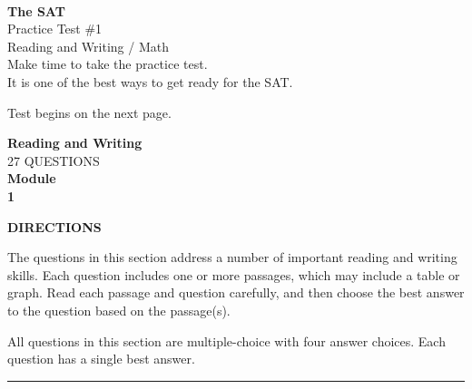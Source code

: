 \documentclass[11pt, twocolumn]{article}
\newcommand{\currentmodulename}{}
\newcommand{\setmodulename}[1]{\renewcommand{\currentmodulename}{#1}}
\newcounter{questionnum}
\begin{document}
\onecolumn
\newpage
\thispagestyle{plainpage}
\begin{center}
\vspace*{1.5in}
{\Huge\textbf{The SAT\textsuperscript{\textregistered}}}\\[24pt]
{\Large Practice Test \#1}\\[24pt]
{\large Reading and Writing / Math}\\[12pt]
{\normalsize Make time to take the practice test.}\\
{\normalsize It is one of the best ways to get ready for the SAT.}
\end{center}

\onecolumn
\newpage
\thispagestyle{plainpage}
\begin{center}
\vspace*{3in}
{\large Test begins on the next page.}
\end{center}

\setmodulename{Medium}
\onecolumn
\newpage
\thispagestyle{plainpage}
\setcounter{questionnum}{0}
\begin{center}
{\Large\textbf{Reading and Writing}}\\[6pt]
{\large 27 QUESTIONS}\\[4pt]
{\large\textbf{Module}}\\
{\Large\textbf{1}}
\end{center}
\vspace{8pt}
\textbf{DIRECTIONS}

The questions in this section address a number of important reading and writing skills. Each question includes one or more passages, which may include a table or graph. Read each passage and question carefully, and then choose the best answer to the question based on the passage(s).

All questions in this section are multiple-choice with four answer choices. Each question has a single best answer.
\vspace{8pt}
\hrule
\vspace{8pt}
\twocolumn
\pagestyle{questionpage}
\end{document}
